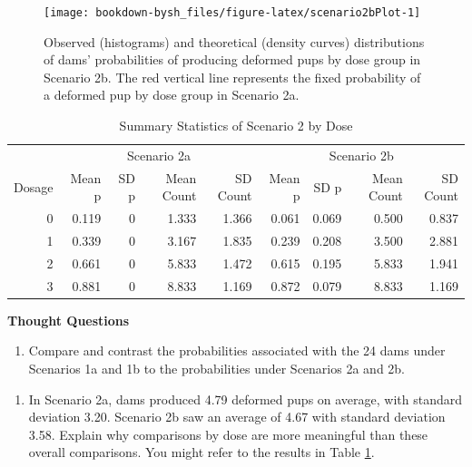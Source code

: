 \documentclass[
]{krantz}
\providecommand{\tightlist}{%
  \setlength{\itemsep}{0pt}\setlength{\parskip}{0pt}}
\renewenvironment{quote}{\begin{VF}}{\end{VF}}
\begin{document}
\begin{figure}

{\centering \texttt{[image: bookdown-bysh\_files/figure-latex/scenario2bPlot-1]} 

}

\caption{Observed (histograms) and theoretical (density curves) distributions of dams' probabilities of producing deformed pups by dose group in Scenario 2b.  The red vertical line represents the fixed probability of a deformed pup by dose group in Scenario 2a.}\label{fig:scenario2bPlot}
\end{figure}

\begin{table}[t]

\caption{\label{tab:scenario2Tab}Summary Statistics of Scenario 2 by Dose}
\centering
\begin{tabular}{rrrrrrrrr}
\toprule
\multicolumn{1}{c}{ } & \multicolumn{4}{c}{Scenario 2a} & \multicolumn{4}{c}{Scenario 2b} \\
\cmidrule(l{2pt}r{2pt}){2-5} \cmidrule(l{2pt}r{2pt}){6-9}
Dosage & Mean p & SD p & Mean Count & SD Count & Mean p & SD p & Mean Count & SD Count\\
\midrule
0 & 0.119 & 0 & 1.333 & 1.366 & 0.061 & 0.069 & 0.500 & 0.837\\
1 & 0.339 & 0 & 3.167 & 1.835 & 0.239 & 0.208 & 3.500 & 2.881\\
2 & 0.661 & 0 & 5.833 & 1.472 & 0.615 & 0.195 & 5.833 & 1.941\\
3 & 0.881 & 0 & 8.833 & 1.169 & 0.872 & 0.079 & 8.833 & 1.169\\
\bottomrule
\end{tabular}
\end{table}

\textbf{Thought Questions}

\begin{quote}
\begin{enumerate}
\def\labelenumi{\arabic{enumi}.}
\setcounter{enumi}{5}
\tightlist
\item
  Compare and contrast the probabilities associated with the 24 dams under Scenarios 1a and 1b to the probabilities under Scenarios 2a and 2b.
\end{enumerate}
\end{quote}

\begin{quote}
\begin{enumerate}
\def\labelenumi{\arabic{enumi}.}
\setcounter{enumi}{6}
\tightlist
\item
  In Scenario 2a, dams produced 4.79 deformed pups on average, with standard deviation 3.20. Scenario 2b saw an average of 4.67 with standard deviation 3.58. Explain why comparisons by dose are more meaningful than these overall comparisons. You might refer to the results in Table \ref{tab:scenario2Tab}.
\end{enumerate}
\end{quote}
\end{document}
